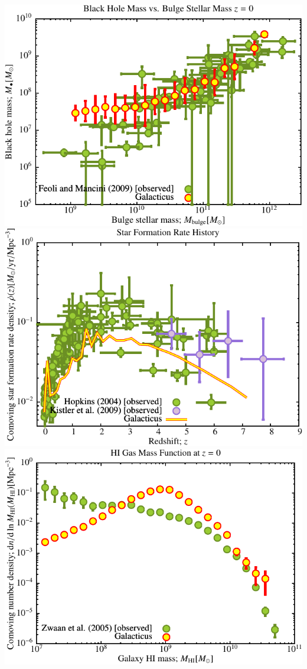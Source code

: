 \includegraphics[scale=0.6]{r256/h70/red_st14_log2/Plot_Black_Hole_vs_Bulge_Mass.pdf}
\includegraphics[scale=0.6]{r256/h70/red_st14_log2/Plot_Star_Formation_History.pdf} \\
\includegraphics[scale=0.6]{r256/h70/red_st14_log2/Plot_HI_Mass_Function.pdf}

